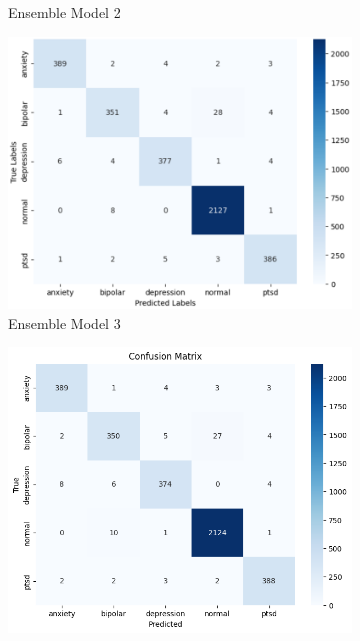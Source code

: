 \begin{figure}[H]
\begin{subfigure}[b]{0.49\textwidth}
        \caption*{Ensemble Model 2}
        \label{em2 cm}  %
    \end{subfigure}
    \hfill
    \begin{subfigure}[b]{0.49\textwidth}
        \centering
        \includegraphics[width=\textwidth]{Images/EM3 CM.png}
        \caption*{Ensemble Model 3}
        \label{em3 cm}  %
    \end{subfigure}
    \hfill
    \vspace{0.5cm}
    \begin{subfigure}[b]{0.49\textwidth}
        \centering
        \includegraphics[width=\textwidth]{Images/BAG CM.png}

\end{subfigure}
\end{figure}

